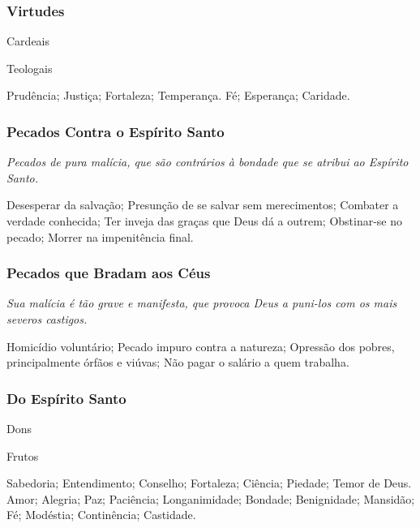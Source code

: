 \subsubsection{Virtudes}

\begin{paracol}{2}
\begin{nscenter}{\redx Cardeais}\end{nscenter}
\switchcolumn
\begin{nscenter}{\redx Teologais}\end{nscenter}
\switchcolumn*
Prudência; Justiça; Fortaleza; Temperança.
\switchcolumn
Fé; Esperança; Caridade.
\end{paracol}

\subsubsection{Pecados Contra o Espírito Santo}

\emph{Pecados de pura malícia, que são contrários à bondade que se atribui ao Espírito Santo.}

Desesperar da salvação; Presunção de se salvar sem merecimentos; Combater a verdade conhecida; Ter inveja das graças que Deus dá a outrem; Obstinar-se no pecado; Morrer na impenitência final.

\subsubsection{Pecados que Bradam aos Céus}

\emph{Sua malícia é tão grave e manifesta, que provoca Deus a puni-los com os mais severos castigos.}

Homicídio voluntário; Pecado impuro contra a natureza; Opressão dos pobres, principalmente órfãos e viúvas; Não pagar o salário a quem trabalha.

\subsubsection{Do Espírito Santo}

\begin{paracol}{2}
\begin{nscenter}{\redx Dons}\end{nscenter}
\switchcolumn
\begin{nscenter}{\redx Frutos}\end{nscenter}
\switchcolumn*
Sabedoria; Entendimento; Conselho; Fortaleza; Ciência; Piedade; Temor de Deus.
\switchcolumn
Amor; Alegria; Paz; Paciência; Longanimidade; Bondade; Benignidade; Mansidão; Fé; Modéstia; Continência; Castidade.
\end{paracol}

